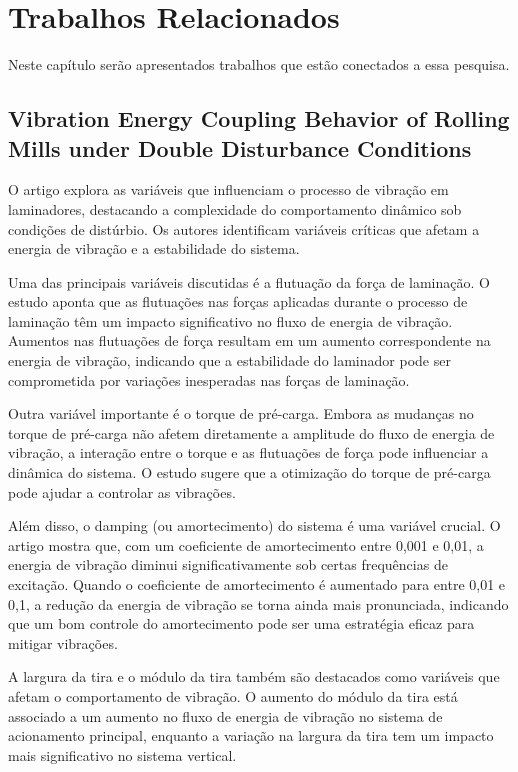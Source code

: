 \chapter{Trabalhos Relacionados}
\label{chap:trabalhos-relacionados}

Neste capítulo serão apresentados trabalhos que estão conectados a essa pesquisa.

\section{Vibration Energy Coupling Behavior of Rolling Mills under Double Disturbance Conditions \cite{vibration-energy-coupling-behavior}}
\label{sec:trabalho-relacionado-a}

O artigo explora as variáveis que influenciam o processo de vibração em laminadores, destacando a complexidade do comportamento dinâmico sob condições de distúrbio. Os autores identificam variáveis críticas que afetam a energia de vibração e a estabilidade do sistema.

Uma das principais variáveis discutidas é a flutuação da força de laminação. O estudo aponta que as flutuações nas forças aplicadas durante o processo de laminação têm um impacto significativo no fluxo de energia de vibração. Aumentos nas flutuações de força resultam em um aumento correspondente na energia de vibração, indicando que a estabilidade do laminador pode ser comprometida por variações inesperadas nas forças de laminação.

Outra variável importante é o torque de pré-carga. Embora as mudanças no torque de pré-carga não afetem diretamente a amplitude do fluxo de energia de vibração, a interação entre o torque e as flutuações de força pode influenciar a dinâmica do sistema. O estudo sugere que a otimização do torque de pré-carga pode ajudar a controlar as vibrações.

Além disso, o damping (ou amortecimento) do sistema é uma variável crucial. O artigo mostra que, com um coeficiente de amortecimento entre 0,001 e 0,01, a energia de vibração diminui significativamente sob certas frequências de excitação. Quando o coeficiente de amortecimento é aumentado para entre 0,01 e 0,1, a redução da energia de vibração se torna ainda mais pronunciada, indicando que um bom controle do amortecimento pode ser uma estratégia eficaz para mitigar vibrações.

A largura da tira e o módulo da tira também são destacados como variáveis que afetam o comportamento de vibração. O aumento do módulo da tira está associado a um aumento no fluxo de energia de vibração no sistema de acionamento principal, enquanto a variação na largura da tira tem um impacto mais significativo no sistema vertical.

